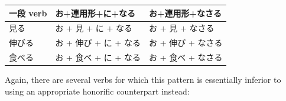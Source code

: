\documentclass[11pt, b5paper, twoside, openright, onecolumn]{book}
\newenvironment{mytabular}[1]{\noindent\hspace{0.4in}
\begin{tabular}[h]{#1}}{\end{tabular}}
\begin{document}
\smaller
\begin{mytabular}{| l  l  l |}\hline 
\rule{0pt}{2.4ex}一段 verb & お+連用形+に+なる & お+連用形+なさる\\ 
\hline
\rule{0pt}{2.4ex}見る & お + 見 + に + なる & お + 見 + なさる\\ 
\rule{0pt}{2.4ex}伸びる & お + 伸び + に + なる & お + 伸び + なさる\\ 
\rule{0pt}{2.4ex}食べる & お + 食べ + に + なる & お + 食べ + なさる\\ 
\hline 
\end{mytabular}
\larger
\vspace{0.5cm}


Again‚ there are several verbs for which this pattern is essentially inferior to using an appropriate honorific counterpart instead:
\end{document}
